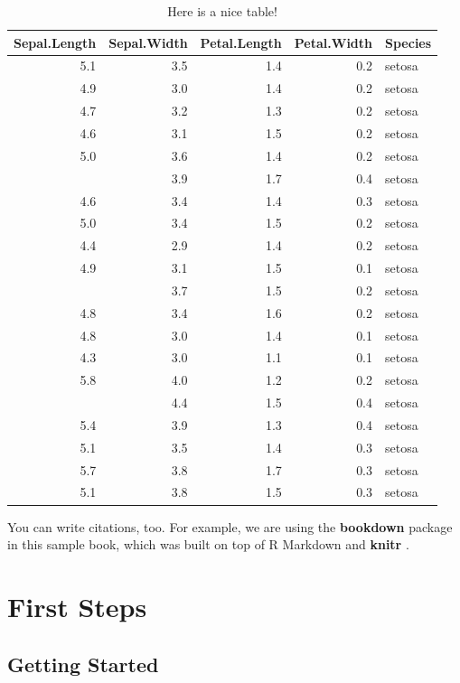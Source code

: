 \documentclass[]{book}
\theoremstyle{definition}
\theoremstyle{definition}
\theoremstyle{definition}
\theoremstyle{remark}
\begin{document}
\begin{table}

\caption{\label{tab:nice-tab}Here is a nice table!}
\centering
\begin{tabular}[t]{rrrrl}
\toprule
Sepal.Length & Sepal.Width & Petal.Length & Petal.Width & Species\\
\midrule
5.1 & 3.5 & 1.4 & 0.2 & setosa\\
4.9 & 3.0 & 1.4 & 0.2 & setosa\\
4.7 & 3.2 & 1.3 & 0.2 & setosa\\
4.6 & 3.1 & 1.5 & 0.2 & setosa\\
5.0 & 3.6 & 1.4 & 0.2 & setosa\\
\addlinespace
5.4 & 3.9 & 1.7 & 0.4 & setosa\\
4.6 & 3.4 & 1.4 & 0.3 & setosa\\
5.0 & 3.4 & 1.5 & 0.2 & setosa\\
4.4 & 2.9 & 1.4 & 0.2 & setosa\\
4.9 & 3.1 & 1.5 & 0.1 & setosa\\
\addlinespace
5.4 & 3.7 & 1.5 & 0.2 & setosa\\
4.8 & 3.4 & 1.6 & 0.2 & setosa\\
4.8 & 3.0 & 1.4 & 0.1 & setosa\\
4.3 & 3.0 & 1.1 & 0.1 & setosa\\
5.8 & 4.0 & 1.2 & 0.2 & setosa\\
\addlinespace
5.7 & 4.4 & 1.5 & 0.4 & setosa\\
5.4 & 3.9 & 1.3 & 0.4 & setosa\\
5.1 & 3.5 & 1.4 & 0.3 & setosa\\
5.7 & 3.8 & 1.7 & 0.3 & setosa\\
5.1 & 3.8 & 1.5 & 0.3 & setosa\\
\bottomrule
\end{tabular}
\end{table}

You can write citations, too. For example, we are using the
\textbf{bookdown} package \citep{R-bookdown} in this sample book, which
was built on top of R Markdown and \textbf{knitr} \citep{xie2015}.

\part{First Steps}\label{part-first-steps}

\chapter{Getting Started}\label{gettingStarted}
\end{document}
